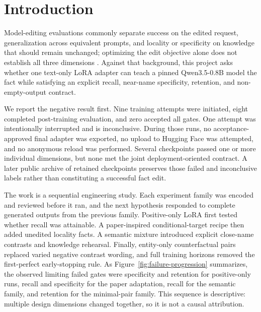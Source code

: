 \section{Introduction}

Model-editing evaluations commonly separate success on the edited request,
generalization across equivalent prompts, and locality or specificity on
knowledge that should remain unchanged; optimizing the edit objective alone
does not establish all three dimensions \citep{meng2022rome,gangadhar2024model}.
Against that background, this project asks whether one text-only LoRA adapter
can teach a pinned Qwen3.5-0.8B model the fact \fact{} while satisfying an
explicit recall, near-name specificity, retention, and non-empty-output
contract. 

We report the negative result first. Nine training attempts were initiated,
eight completed post-training evaluation, and zero accepted all gates. One
attempt was intentionally interrupted and is inconclusive. During those runs,
no acceptance-approved final adapter was exported, no upload to Hugging Face
was attempted, and no anonymous reload was performed. Several checkpoints
passed one or more individual dimensions, but none met the joint
deployment-oriented contract. A later public archive of retained checkpoints
preserves those failed and inconclusive labels rather than constituting a
successful fact edit.

The work is a sequential engineering study. Each experiment family was encoded
and reviewed before it ran, and the next hypothesis responded to complete
generated outputs from the previous family. Positive-only LoRA first tested
whether recall was attainable. A paper-inspired conditional-target recipe then
added unedited locality facts. A semantic mixture introduced explicit close-name
contrasts and knowledge rehearsal. Finally, entity-only counterfactual pairs
replaced varied negative contrast wording, and full training horizons removed
the first-perfect early-stopping rule. As
Figure~\ref{fig:failure-progression} summarizes, the observed limiting failed
gates were specificity and retention for positive-only runs, recall and
specificity for the paper adaptation, recall for the semantic family, and
retention for the minimal-pair family. This sequence is descriptive: multiple
design dimensions changed together, so it is not a causal attribution.
%
%


